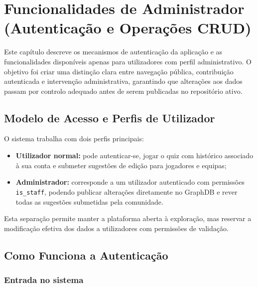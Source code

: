 \chapter{Funcionalidades de Administrador (Autentica\c{c}\~ao e Opera\c{c}\~oes CRUD)}

Este cap\'itulo descreve os mecanismos de autentica\c{c}\~ao da aplica\c{c}\~ao e as funcionalidades dispon\'iveis apenas para utilizadores com perfil administrativo. O objetivo foi criar uma distin\c{c}\~ao clara entre navega\c{c}\~ao p\'ublica, contribui\c{c}\~ao autenticada e interven\c{c}\~ao administrativa, garantindo que altera\c{c}\~oes aos dados passam por controlo adequado antes de serem publicadas no reposit\'orio ativo.

\section{Modelo de Acesso e Perfis de Utilizador}

O sistema trabalha com dois perfis principais:

\begin{itemize}[leftmargin=*]
    \item \textbf{Utilizador normal:} pode autenticar-se, jogar o quiz com hist\'orico associado \`a sua conta e submeter sugest\~oes de edi\c{c}\~ao para jogadores e equipas;
    \item \textbf{Administrador:} corresponde a um utilizador autenticado com permiss\~oes \texttt{is\_staff}, podendo publicar altera\c{c}\~oes diretamente no GraphDB e rever todas as sugest\~oes submetidas pela comunidade.
\end{itemize}

Esta separa\c{c}\~ao permite manter a plataforma aberta \`a explora\c{c}\~ao, mas reservar a modifica\c{c}\~ao efetiva dos dados a utilizadores com permiss\~oes de valida\c{c}\~ao.

\section{Como Funciona a Autentica\c{c}\~ao}

\subsection{Entrada no sistema}

